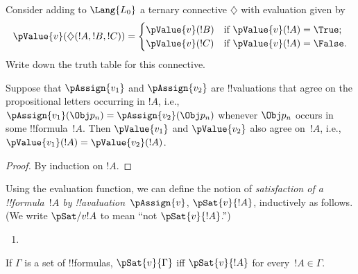 \documentclass[../../../include/open-logic-section]{subfiles}
\begin{document}
\begin{prob}
Consider adding to \( \Lang{L_0} \) a ternary connective \( \diamondsuit \) with evaluation given by 
\begin{gather*}
  \pValue{v}(\diamondsuit( !A , !B , !C ) ) = \begin{cases} 
    \pValue{v}( !B ) &
    \text{if $\pValue{v}(!A) = \True$;}\\
    \pValue{v}( !C ) &
    \text{if $\pValue{v}(!A) = \False $}.
  \end{cases}
\end{gather*}
Write down the truth table for this connective.
\end{prob}

\begin{thm}  
 Suppose that $\pAssign{v_1}$ and
$\pAssign{v_2}$ are !!{valuation}s that agree on the propositional
letters occurring in $!A$, i.e., $\pAssign{v_1}(\Obj p_n) =
\pAssign{v_2}(\Obj p_n)$ whenever $\Obj p_n$ occurs in some !!{formula}~$!A$. Then $\pValue{v_1}$ and $\pValue{v_2}$ also agree on~$!A$, i.e., $\pValue{v_1}(!A) = \pValue{v_2}(!A)$.
\end{thm}

\begin{proof} 
By induction on $!A$. 
\end{proof}

\begin{defn}[Satisfaction]
 Using the evaluation function, we can
define the notion of \emph{satisfaction of a !!{formula}~$!A$ by
  !!a{valuation}~$\pAssign{v}$}, $\pSat{v}{!A}$, inductively as
  follows. (We write $\pSat/{v}{!A}$ to mean ``not
  $\pSat{v}{!A}$.'')
\begin{enumerate}


\item {}





\end{enumerate}
If $\Gamma$ is a set of !!{formula}s, $\pSat{v}{\Gamma}$ iff
$\pSat{v}{!A}$ for every~$!A \in \Gamma$.
\end{defn}
\end{document}
